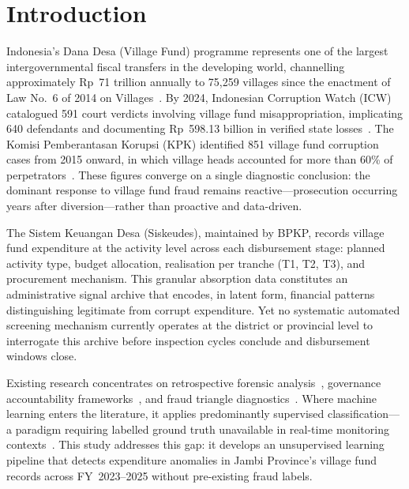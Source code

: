 \documentclass[3p,times,procedia]{elsarticle}
\begin{document}
\vspace*{-6pt}

\section{Introduction}
\label{sec:intro}

Indonesia's Dana Desa (Village Fund) programme represents one of the largest intergovernmental fiscal transfers in the developing world, channelling approximately Rp~71 trillion annually to 75,259 villages since the enactment of Law No.~6 of 2014 on Villages~\cite{ref1}. By 2024, Indonesian Corruption Watch (ICW) catalogued 591 court verdicts involving village fund misappropriation, implicating 640 defendants and documenting Rp~598.13 billion in verified state losses~\cite{ref2}. The Komisi Pemberantasan Korupsi (KPK) identified 851 village fund corruption cases from 2015 onward, in which village heads accounted for more than 60\% of perpetrators~\cite{ref3}. These figures converge on a single diagnostic conclusion: the dominant response to village fund fraud remains reactive---prosecution occurring years after diversion---rather than proactive and data-driven.

The Sistem Keuangan Desa (Siskeudes), maintained by BPKP, records village fund expenditure at the activity level across each disbursement stage: planned activity type, budget allocation, realisation per tranche (T1, T2, T3), and procurement mechanism. This granular absorption data constitutes an administrative signal archive that encodes, in latent form, financial patterns distinguishing legitimate from corrupt expenditure. Yet no systematic automated screening mechanism currently operates at the district or provincial level to interrogate this archive before inspection cycles conclude and disbursement windows close.

Existing research concentrates on retrospective forensic analysis~\cite{ref4}, governance accountability frameworks~\cite{ref5}, and fraud triangle diagnostics~\cite{ref6}. Where machine learning enters the literature, it applies predominantly supervised classification---a paradigm requiring labelled ground truth unavailable in real-time monitoring contexts~\cite{ref13,ref14}. This study addresses this gap: it develops an unsupervised learning pipeline that detects expenditure anomalies in Jambi Province's village fund records across FY~2023--2025 without pre-existing fraud labels.
\end{document}
